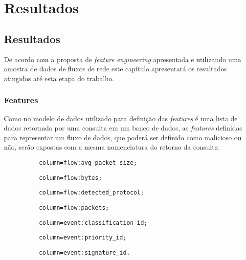 \part{Resultados}
\chapter[Resultados]{Resultados}

    De acordo com a proposta de \textit{feature engineering} apresentada e utilizando uma amostra de dados de fluxos de rede este capítulo apresentará os resultados atingidos até esta etapa do trabalho.

    \section{Features}
        Como no modelo de dados utilizado para definição das \textit{features} é uma lista de dados retornada por uma consulta em um banco de dados, as \textit{features} definidas para representar um fluxo de dados, que poderá ser definido como malicioso ou não, serão expostas com a mesma nomenclatura do retorno da consulta:
        \\
        \begin{lstlisting}
          column=flow:avg_packet_size;
        \end{lstlisting}

        \begin{lstlisting}
          column=flow:bytes;
        \end{lstlisting}

        \begin{lstlisting}
          column=flow:detected_protocol;
        \end{lstlisting}

        \begin{lstlisting}
          column=flow:packets;
        \end{lstlisting}

        \begin{lstlisting}
          column=event:classification_id;
        \end{lstlisting}

        \begin{lstlisting}
          column=event:priority_id;
        \end{lstlisting}

        \begin{lstlisting}
          column=event:signature_id.
        \end{lstlisting}


